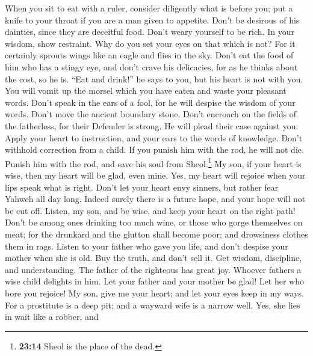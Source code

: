 \begin{paracol}{2}
\begin{otherlanguage}{english}
 When you sit to eat with a ruler, consider diligently
what is before you;  put a knife to your throat if you are
a man given to appetite.  Don't be desirous of his
dainties, since they are deceitful food.  Don't weary
yourself to be rich. In your wisdom, show restraint.  Why
do you set your eyes on that which is not? For it certainly sprouts
wings like an eagle and flies in the sky.  Don't eat the
food of him who has a stingy eye, and don't crave his delicacies,
 for as he thinks about the cost, so he is. ``Eat and
drink!'' he says to you, but his heart is not with you. 
You will vomit up the morsel which you have eaten and waste your
pleasant words.  Don't speak in the ears of a fool, for he
will despise the wisdom of your words.  Don't move the
ancient boundary stone. Don't encroach on the fields of the fatherless,
 for their Defender is strong. He will plead their case
against you.  Apply your heart to instruction, and your
ears to the words of knowledge.  Don't withhold
correction from a child. If you punish him with the rod, he will not
die.  Punish him with the rod, and save his soul from
Sheol.\footnote{\textbf{23:14} Sheol is the place of the dead.}
 My son, if your heart is wise, then my heart will be
glad, even mine.  Yes, my heart will rejoice when your
lips speak what is right.  Don't let your heart envy
sinners, but rather fear Yahweh all day long.  Indeed
surely there is a future hope, and your hope will not be cut off.
 Listen, my son, and be wise, and keep your heart on the
right path!  Don't be among ones drinking too much wine,
or those who gorge themselves on meat;  for the drunkard
and the glutton shall become poor; and drowsiness clothes them in rags.
 Listen to your father who gave you life, and don't
despise your mother when she is old.  Buy the truth, and
don't sell it. Get wisdom, discipline, and understanding.
 The father of the righteous has great joy. Whoever
fathers a wise child delights in him.  Let your father
and your mother be glad! Let her who bore you rejoice! 
My son, give me your heart; and let your eyes keep in my ways.
 For a prostitute is a deep pit; and a wayward wife is a
narrow well.  Yes, she lies in wait like a robber, and

\end{otherlanguage}
\end{paracol}
